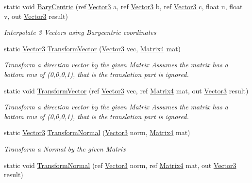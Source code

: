 \begin{DoxyCompactItemize}
static void \hyperlink{struct_open_t_k_1_1_vector3_ab009673d19b7c8064cfe209559eefe1d}{Bary\-Centric} (ref \hyperlink{struct_open_t_k_1_1_vector3}{Vector3} a, ref \hyperlink{struct_open_t_k_1_1_vector3}{Vector3} b, ref \hyperlink{struct_open_t_k_1_1_vector3}{Vector3} c, float u, float v, out \hyperlink{struct_open_t_k_1_1_vector3}{Vector3} result)
\begin{DoxyCompactList}\small\item\em Interpolate 3 Vectors using Barycentric coordinates\end{DoxyCompactList}\item 
static \hyperlink{struct_open_t_k_1_1_vector3}{Vector3} \hyperlink{struct_open_t_k_1_1_vector3_a6d45aca798ec51d72280a7b823037121}{Transform\-Vector} (\hyperlink{struct_open_t_k_1_1_vector3}{Vector3} vec, \hyperlink{struct_open_t_k_1_1_matrix4}{Matrix4} mat)
\begin{DoxyCompactList}\small\item\em Transform a direction vector by the given Matrix Assumes the matrix has a bottom row of (0,0,0,1), that is the translation part is ignored. \end{DoxyCompactList}\item 
static void \hyperlink{struct_open_t_k_1_1_vector3_adc9fcc16fde265b0d24f318bba8bd44e}{Transform\-Vector} (ref \hyperlink{struct_open_t_k_1_1_vector3}{Vector3} vec, ref \hyperlink{struct_open_t_k_1_1_matrix4}{Matrix4} mat, out \hyperlink{struct_open_t_k_1_1_vector3}{Vector3} result)
\begin{DoxyCompactList}\small\item\em Transform a direction vector by the given Matrix Assumes the matrix has a bottom row of (0,0,0,1), that is the translation part is ignored. \end{DoxyCompactList}\item 
static \hyperlink{struct_open_t_k_1_1_vector3}{Vector3} \hyperlink{struct_open_t_k_1_1_vector3_a609bbbfc1a1569d9c6097f72966ed513}{Transform\-Normal} (\hyperlink{struct_open_t_k_1_1_vector3}{Vector3} norm, \hyperlink{struct_open_t_k_1_1_matrix4}{Matrix4} mat)
\begin{DoxyCompactList}\small\item\em Transform a Normal by the given Matrix\end{DoxyCompactList}\item 
static void \hyperlink{struct_open_t_k_1_1_vector3_a7cfbe62c9b6e04c3ed4721953c10d613}{Transform\-Normal} (ref \hyperlink{struct_open_t_k_1_1_vector3}{Vector3} norm, ref \hyperlink{struct_open_t_k_1_1_matrix4}{Matrix4} mat, out \hyperlink{struct_open_t_k_1_1_vector3}{Vector3} result)

\end{DoxyCompactItemize}
